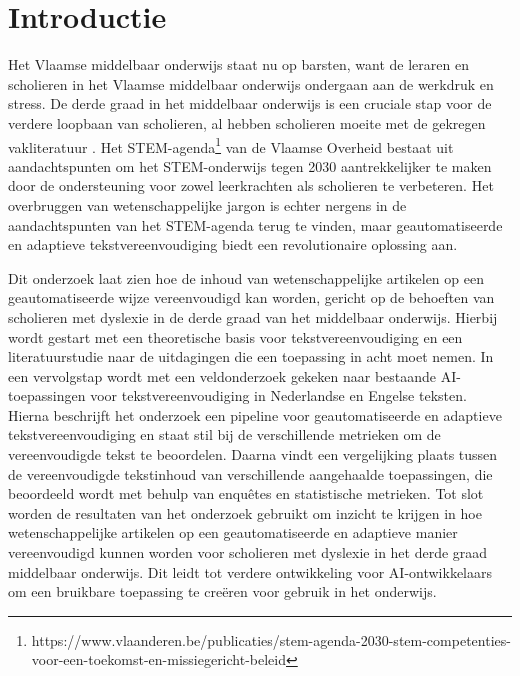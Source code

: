 
\section{Introductie}%
\label{sec:introductie}


Het Vlaamse middelbaar onderwijs staat nu op barsten, want de leraren en scholieren in het Vlaamse middelbaar onderwijs ondergaan aan de werkdruk en stress. De derde graad in het middelbaar onderwijs is een cruciale stap voor de verdere loopbaan van scholieren, al hebben scholieren moeite met de gekregen vakliteratuur \autocite{Dapaah2022}. Het STEM-agenda\footnote{https://www.vlaanderen.be/publicaties/stem-agenda-2030-stem-competenties-voor-een-toekomst-en-missiegericht-beleid} van de Vlaamse Overheid bestaat uit aandachtspunten om het STEM-onderwijs tegen 2030 aantrekkelijker te maken door de ondersteuning voor zowel leerkrachten als scholieren te verbeteren. Het overbruggen van wetenschappelijke jargon is echter nergens in de aandachtspunten van het STEM-agenda terug te vinden, maar geautomatiseerde en adaptieve tekstvereenvoudiging biedt een revolutionaire oplossing aan. 

Dit onderzoek laat zien hoe de inhoud van wetenschappelijke artikelen op een geautomatiseerde wijze vereenvoudigd kan worden, gericht op de behoeften van scholieren met dyslexie in de derde graad van het middelbaar onderwijs. Hierbij wordt gestart met een theoretische basis voor tekstvereenvoudiging en een literatuurstudie naar de uitdagingen die een toepassing in acht moet nemen. In een vervolgstap wordt met een veldonderzoek gekeken naar bestaande AI-toepassingen voor tekstvereenvoudiging in Nederlandse en Engelse teksten. Hierna beschrijft het onderzoek een pipeline voor geautomatiseerde en adaptieve tekstvereenvoudiging en staat stil bij de verschillende metrieken om de vereenvoudigde tekst te beoordelen. Daarna vindt een vergelijking plaats tussen de vereenvoudigde tekstinhoud van verschillende aangehaalde toepassingen, die beoordeeld wordt met behulp van enquêtes en statistische metrieken. Tot slot worden de resultaten van het onderzoek gebruikt om inzicht te krijgen in hoe wetenschappelijke artikelen op een geautomatiseerde en adaptieve manier vereenvoudigd kunnen worden voor scholieren met dyslexie in het derde graad middelbaar onderwijs. Dit leidt tot verdere ontwikkeling voor AI-ontwikkelaars om een bruikbare toepassing te creëren voor gebruik in het onderwijs.


